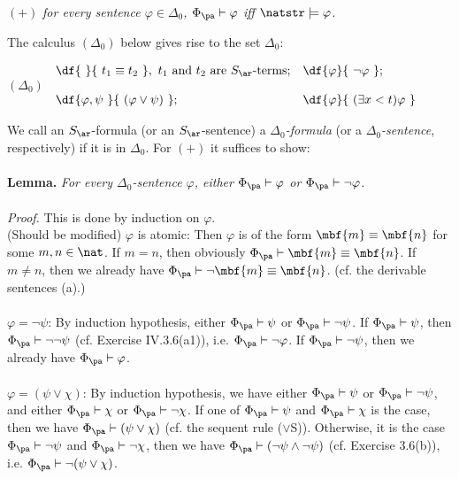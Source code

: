 \begin{center}
$(+)$ \hfill \emph{for every sentence $\varphi \in \Delta_0$, $\Phi_\pa \vdash \varphi$ iff $\natstr \models \varphi$.} \hfill \phantom{$(*)$}
\end{center}
The calculus $(\Delta_0)$ below gives rise to the set $\Delta_0$:
\begin{center}
$(\Delta_0)$ \hfill 
\begin{math}\begin{array}{ll}
\df{\ }{\ t_1 \equiv t_2\ }, \ \mbox{$t_1$ and $t_2$ are $S_\ar$-terms}; & \df{\varphi}{\ \neg\varphi\ }; \cr
\ & \ \cr
\df{\varphi, \psi\ }{\ (\varphi \lor \psi)\ }; & \df{\varphi}{\ (\exists x < t) \varphi\ }
\end{array}\end{math} \hfill \phantom{($\Delta_0$)}
\end{center}
We call an $S_\ar$-formula (or an $S_\ar$-sentence) a \emph{$\Delta_0$-formula} (or a \emph{$\Delta_0$-sentence}, respectively) if it is in $\Delta_0$. For $(+)$ it suffices to show:\\
\ \\
\textbf{Lemma.} \emph{For every $\Delta_0$-sentence $\varphi$, either $\Phi_\pa \vdash \varphi$ or $\Phi_\pa \vdash \neg\varphi$.}\\
\ \\
\textit{Proof.} This is done by induction on $\varphi$.\\
(Should be modified) $\varphi$ is atomic: Then $\varphi$ is of the form $\mbf{m} \equiv \mbf{n}$ for some $m, n \in \nat$. If $m = n$, then obviously $\Phi_\pa \vdash \mbf{m} \equiv \mbf{n}$. If $m \neq n$, then we already have $\Phi_\pa \vdash \neg \mbf{m} \equiv \mbf{n}$. (cf. the derivable sentences (a).)\\
\ \\
$\varphi = \neg\psi$: By induction hypothesis, either $\Phi_\pa \vdash \psi$ or $\Phi_\pa \vdash \neg\psi$. If $\Phi_\pa \vdash \psi$, then $\Phi_\pa \vdash \neg\neg\psi$ (cf. Exercise IV.3.6(a1)), i.e. $\Phi_\pa \vdash \neg\varphi$. If $\Phi_\pa \vdash \neg\psi$, then we already have $\Phi_\pa \vdash \varphi$.\\
\ \\
$\varphi = (\psi \lor \chi)$: By induction hypothesis, we have either $\Phi_\pa \vdash \psi$ or $\Phi_\pa \vdash \neg\psi$, and either $\Phi_\pa \vdash \chi$ or $\Phi_\pa \vdash \neg\chi$. If one of $\Phi_\pa \vdash \psi$ and $\Phi_\pa \vdash \chi$ is the case, then we have $\Phi_\pa \vdash (\psi \lor \chi)$ (cf. the sequent rule ($\lor$S)). Otherwise, it is the case $\Phi_\pa \vdash \neg\psi$ and $\Phi_\pa \vdash \neg\chi$, then we have $\Phi_\pa \vdash (\neg\psi \land \neg\psi)$ (cf. Exercise 3.6(b)), i.e. $\Phi_\pa \vdash \neg(\psi \lor \chi)$.\\
